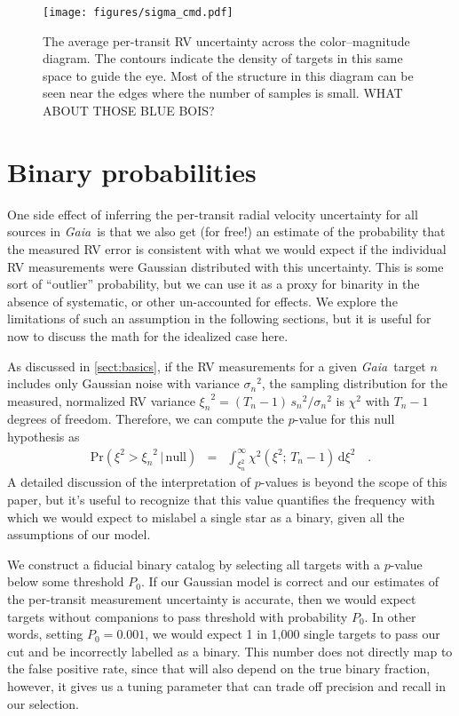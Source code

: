 \documentclass[modern, letterpaper]{aastex631}
\newcommand{\project}[1]{\textsl{#1}}
\newcommand{\Gaia}{\project{Gaia}}
\newcommand{\dd}{\ensuremath{\,\mathrm{d}}}
\begin{document}
\begin{figure}
	\begin{centering}
		\texttt{[image: figures/sigma\_cmd.pdf]}
		\caption{The average per-transit RV uncertainty across the color--magnitude diagram.
			The contours indicate the density of targets in this same space to guide the eye.
			Most of the structure in this diagram can be seen near the edges where the number of samples is small.
			WHAT ABOUT THOSE BLUE BOIS?}
		\label{fig:sigma_cmd}
	\end{centering}
\end{figure}


\section{Binary probabilities}

One side effect of inferring the per-transit radial velocity uncertainty for all sources in \Gaia\ is that we also get (for free!) an estimate of the probability that the measured RV error is consistent with what we would expect if the individual RV measurements were Gaussian distributed with this uncertainty.
This is some sort of ``outlier'' probability, but we can use it as a proxy for binarity in the absence of systematic, or other un-accounted for effects.
We explore the limitations of such an assumption in the following sections, but it is useful for now to discuss the math for the idealized case here.

As discussed in \autoref{sect:basics}, if the RV measurements for a given \Gaia\ target $n$ includes only Gaussian noise with variance ${\sigma_n}^2$, the sampling distribution for the measured, normalized RV variance ${\xi_n}^2 = (T_n - 1)\,{s_n}^2 / {\sigma_n}^2$ is $\chi^2$ with $T_n - 1$ degrees of freedom.
Therefore, we can compute the $p$-value for this null hypothesis as
\begin{eqnarray}
	\mathrm{Pr}(\xi^2 > {\xi_n}^2\,|\,\mathrm{null}) &=& \int_{\xi_n^2}^\infty \chi^2 (\xi^2;\,T_n-1) \dd \xi^2 \quad.
\end{eqnarray}
A detailed discussion of the interpretation of $p$-values is beyond the scope of this paper, but it's useful to recognize that this value quantifies the frequency with which we would expect to mislabel a single star as a binary, given all the assumptions of our model.

We construct a fiducial binary catalog by selecting all targets with a $p$-value below some threshold $P_0$.
If our Gaussian model is correct and our estimates of the per-transit measurement uncertainty is accurate, then we would expect targets without companions to pass threshold with probability $P_0$.
In other words, setting $P_0 = 0.001$, we would expect 1 in 1,000 single targets to pass our cut and be incorrectly labelled as a binary.
This number does not directly map to the false positive rate, since that will also depend on the true binary fraction, however, it gives us a tuning parameter that can trade off precision and recall in our selection.
\end{document}
